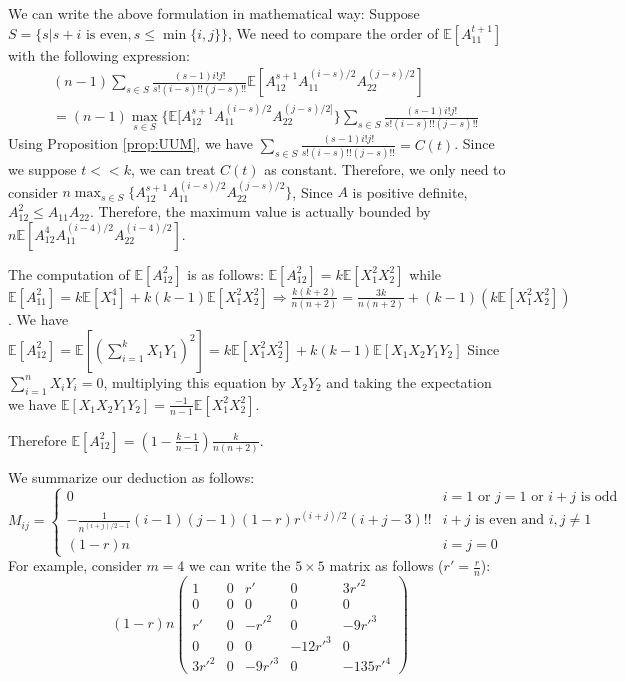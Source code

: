 \documentclass{article}
\def\E{\mathbb{E}}
\begin{document}
We can write the above formulation in mathematical way:
Suppose $S=\{s| s+i \textrm{ is even}, s\leq \min\{i,j\} \}$,
We need to compare the order of $\E[A_{11}^{t+1}]$ with the following expression:
\begin{align*}
&(n-1) \sum_{s \in S}
\frac{(s-1)i!j!}{s!(i-s)!!(j-s)!!}
\E[A_{12}^{s+1} A_{11}^{(i - s) /2}A_{22}^{(j - s)/2}]\\
&=(n-1) \max_{s\in S}\{\E[A_{12}^{s+1} A_{11}^{(i - s) /2}A_{22}^{(j - s)/2]}\}\sum_{s \in S}
\frac{(s-1)i!j!}{s!(i-s)!!(j-s)!!}
\end{align*}
Using Proposition \ref{prop:UUM}, we have 
$\sum_{s \in S}
\frac{(s-1)i!j!}{s!(i-s)!!(j-s)!!} = C(t)$. Since we suppose $t << k$, we can treat $C(t)$ as constant.
Therefore, we only need to consider $n\max_{s\in S}\{A_{12}^{s+1} A_{11}^{(i - s) /2}A_{22}^{(j - s)/2}\}$,
Since $A$ is positive definite, $A_{12}^2 \leq A_{11}A_{22}$. Therefore, the maximum value is actually bounded by
$n \E[A_{12}^4 A_{11}^{(i-4)/2} A_{22}^{(i-4)/2}]$. 

The computation of $\E[A^2_{12}]$ is as follows:
$\E[A^2_{12}] = k \E[X_1^2X_2^2]$ while
$\E[A_{11}^2] = k\E[X_1^4] + k(k-1)\E[X_1^2 X_2^2] \Rightarrow
\frac{k(k+2)}{n(n+2)} = \frac{3k}{n(n+2)} + (k-1) (k \E[X_1^2 X_2^2])$.
We have $\E[A_{12}^2] = \E[(\sum_{i=1}^k X_1 Y_1)^2]
= k \E[X_1^2X^2_2] + k(k-1)\E[X_1X_2Y_1Y_2]
$
Since $\sum_{i=1}^n X_i Y_i = 0$, multiplying this equation by $X_2Y_2$ and taking the expectation
we have $\E[X_1X_2Y_1Y_2] = \frac{-1}{n-1} \E[X_1^2 X_2^2]$.

Therefore $\E[A^2_{12}]=(1-\frac{k-1}{n-1}) \frac{k}{n(n+2)}$.

We summarize our deduction as follows:
\begin{equation}
M_{ij} = \begin{cases} 0 & i=1 \textrm{ or } j=1 \textrm{ or } i + j
\textrm{ is odd} \\
 -\frac{1}{n^{(i+j)/2-1}}(i-1)(j-1) (1-r)r^{(i+j)/ 2 } (i+j-3)!! & i+j
 \textrm{ is even and } i,j \neq 1 \\
(1-r)n & i=j=0
\end{cases}
\end{equation}
For example, consider $m = 4$
we can write the $ 5 \times 5 $ matrix as follows ($r'=\frac{r}{n}$):
$$
(1-r)n\begin{pmatrix}
1 & 0 & r'  & 0 & 3r'^2\\
0 & 0 & 0  & 0 & 0\\
r' &  0 & - r'^2 & 0 & -9 r'^3 \\
0 & 0 & 0 & -12r'^3 & 0 \\
3r'^2 & 0 & -9 r'^3 & 0 & -135r'^4
\end{pmatrix}
$$
\end{document}
